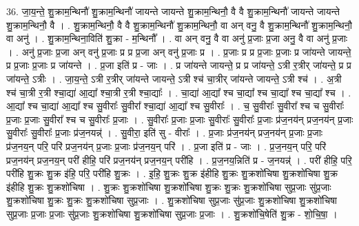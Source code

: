 \documentclass[17pt]{extarticle}
\begin{document}
36. जा॒य॒न्ते॒ शु॒क्राम॒न्थिनौ॑ शु॒क्राम॒न्थिनौ॑ जायन्ते जायन्ते शु॒क्राम॒न्थिनौ॒ वै वै शु॒क्राम॒न्थिनौ॑ जायन्ते जायन्ते शु॒क्राम॒न्थिनौ॒ वै । . शु॒क्राम॒न्थिनौ॒ वै वै शु॒क्राम॒न्थिनौ॑ शु॒क्राम॒न्थिनौ॒ वा अन् वनु॒ वै शु॒क्राम॒न्थिनौ॑ शु॒क्राम॒न्थिनौ॒ वा अनु॑ । . शु॒क्राम॒न्थिना॒विति॑ शु॒क्रा - म॒न्थिनौ᳚ । . वा अन् वनु॒ वै वा अनु॑ प्र॒जाः प्र॒जा अनु॒ वै वा अनु॑ प्र॒जाः । . अनु॑ प्र॒जाः प्र॒जा अन् वनु॑ प्र॒जाः प्र प्र प्र॒जा अन् वनु॑ प्र॒जाः प्र । . प्र॒जाः प्र प्र प्र॒जाः प्र॒जाः प्र जा॑यन्ते जायन्ते॒ प्र प्र॒जाः प्र॒जाः प्र जा॑यन्ते । . प्र॒जा इति॑ प्र - जाः । . प्र जा॑यन्ते जायन्ते॒ प्र प्र जा॑यन्ते॒ ऽत्री र॒त्रीर् जा॑यन्ते॒ प्र प्र जा॑यन्ते॒ ऽत्रीः । . जा॒य॒न्ते॒ ऽत्री र॒त्रीर् जा॑यन्ते जायन्ते॒ ऽत्री श्च॑ चा॒त्रीर् जा॑यन्ते जायन्ते॒ ऽत्री श्च॑ । . अ॒त्री श्च॑ चा॒त्री र॒त्री श्चा॒द्या॑ आ॒द्या᳚ श्चा॒त्री र॒त्री श्चा॒द्याः᳚ । . चा॒द्या॑ आ॒द्या᳚ श्च चा॒द्या᳚ श्च चा॒द्या᳚ श्च चा॒द्या᳚ श्च । . आ॒द्या᳚ श्च चा॒द्या॑ आ॒द्या᳚ श्च सु॒वीराः᳚ सु॒वीरा᳚ श्चा॒द्या॑ आ॒द्या᳚ श्च सु॒वीराः᳚ । . च॒ सु॒वीराः᳚ सु॒वीरा᳚ श्च च सु॒वीराः᳚ प्र॒जाः प्र॒जाः सु॒वीरा᳚ श्च च सु॒वीराः᳚ प्र॒जाः । . सु॒वीराः᳚ प्र॒जाः प्र॒जाः सु॒वीराः᳚ सु॒वीराः᳚ प्र॒जाः प्र॑ज॒नय॑न् प्रज॒नय॑न् प्र॒जाः सु॒वीराः᳚ सु॒वीराः᳚ प्र॒जाः प्र॑ज॒नयन्न्॑ । . सु॒वीरा॒ इति॑ सु - वीराः᳚ । . प्र॒जाः प्र॑ज॒नय॑न् प्रज॒नय॑न् प्र॒जाः प्र॒जाः प्र॑ज॒नय॒न् परि॒ परि॑ प्रज॒नय॑न् प्र॒जाः प्र॒जाः प्र॑ज॒नय॒न् परि॑ । . प्र॒जा इति॑ प्र - जाः । . प्र॒ज॒नय॒न् परि॒ परि॑ प्रज॒नय॑न् प्रज॒नय॒न् परी॑ हीहि॒ परि॑ प्रज॒नय॑न् प्रज॒नय॒न् परी॑हि । . प्र॒ज॒नय॒न्निति॑ प्र - ज॒नयन्न्॑ । . परी॑ हीहि॒ परि॒ परी॑हि शु॒क्रः शु॒क्र इ॑हि॒ परि॒ परी॑हि शु॒क्रः । . इ॒हि॒ शु॒क्रः शु॒क्र इ॑हीहि शु॒क्रः शु॒क्रशो॑चिषा शु॒क्रशो॑चिषा शु॒क्र इ॑हीहि शु॒क्रः शु॒क्रशो॑चिषा । . शु॒क्रः शु॒क्रशो॑चिषा शु॒क्रशो॑चिषा शु॒क्रः शु॒क्रः शु॒क्रशो॑चिषा सुप्र॒जाः सु॑प्र॒जाः शु॒क्रशो॑चिषा शु॒क्रः शु॒क्रः शु॒क्रशो॑चिषा सुप्र॒जाः । . शु॒क्रशो॑चिषा सुप्र॒जाः सु॑प्र॒जाः शु॒क्रशो॑चिषा शु॒क्रशो॑चिषा सुप्र॒जाः प्र॒जाः प्र॒जाः सु॑प्र॒जाः शु॒क्रशो॑चिषा शु॒क्रशो॑चिषा सुप्र॒जाः प्र॒जाः । . शु॒क्रशो॑चि॒षेति॑ शु॒क्र - शो॒चि॒षा॒ । \newline
\pagebreak
{}
\end{document}
